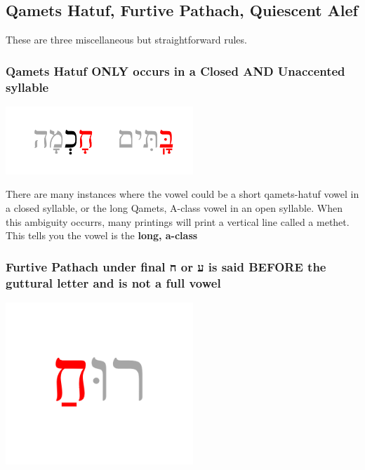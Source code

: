 \documentclass[
]{turabian-researchpaper}
\begin{document}
\hypertarget{three_7}{%
\subsection{Qamets Hatuf, Furtive Pathach, Quiescent Alef}\label{three_7}}

These are three miscellaneous but straightforward rules.

\hypertarget{qamets-hatuf-only-occurs-in-a-closed-and-unaccented-syllable}{%
\subsubsection*{Qamets Hatuf ONLY occurs in a Closed AND Unaccented syllable}\label{qamets-hatuf-only-occurs-in-a-closed-and-unaccented-syllable}}

\begin{center}\includegraphics[width=200pt]{images/03.qametshatuf} \end{center}

There are many instances where the vowel could be a short qamets-hatuf vowel in a closed syllable, or the long Qamets, A-class vowel in an open syllable. When this ambiguity occurrs, many printings will print a vertical line called a methet. This tells you the vowel is the \textbf{long, a-class}

\hypertarget{furtive-pathach-under-final-ux5d7-or-ux5e2-is-said-before-the-guttural-letter-and-is-not-a-full-vowel}{%
\subsubsection{Furtive Pathach under final ח or ע is said BEFORE the guttural letter and is not a full vowel}\label{furtive-pathach-under-final-ux5d7-or-ux5e2-is-said-before-the-guttural-letter-and-is-not-a-full-vowel}}

\begin{center}\includegraphics[width=200pt]{images/03.furtivepathach} \end{center}
\end{document}
